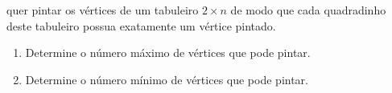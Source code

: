  quer pintar os vértices de um tabuleiro $2 \times n$ de modo que cada quadradinho deste tabuleiro possua exatamente um vértice pintado.
\begin{enumerate}[label = (\alph*)]
	\item Determine o número máximo de vértices que  pode pintar.
	\item Determine o número mínimo de vértices que  pode pintar.
\end{enumerate}
